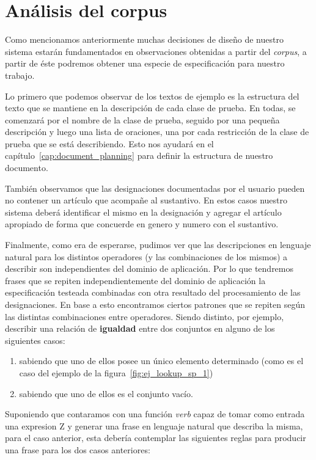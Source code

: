 \section{Análisis del corpus}
\label{sec:corpus_analisis}

Como mencionamos anteriormente muchas decisiones de diseño de nuestro sistema estarán fundamentados en observaciones obtenidas a partir del \emph{corpus}, a partir de éste podremos obtener una especie de especificación para nuestro trabajo.

Lo primero que podemos observar de los textos de ejemplo es la estructura del texto que se mantiene en la descripción de cada clase de prueba. En todas, se comenzará por el nombre de la clase de prueba, seguido por una pequeña descripción y luego una lista de oraciones, una por cada restricción de la clase de prueba que se está describiendo. Esto nos ayudará en el capítulo~\ref{cap:document_planning} para definir la estructura de nuestro documento. 



También observamos que las designaciones documentadas por el usuario pueden no contener un artículo que acompañe al sustantivo. En estos casos nuestro sistema deberá identificar el mismo en la designación y agregar el artículo apropiado de forma que concuerde en genero y numero con el sustantivo. 

Finalmente, como era de esperarse, pudimos ver que las descripciones en lenguaje natural para los distintos operadores (y las combinaciones de los mismos) a describir son independientes del dominio de aplicación. Por lo que tendremos frases que se repiten independientemente del dominio de aplicación la especificación testeada combinadas con otra resultado del procesamiento de las designaciones. En base a esto encontramos ciertos patrones que se repiten según las distintas combinaciones entre operadores.  Siendo distinto, por ejemplo, describir una relación de \textbf{igualdad} entre dos conjuntos en alguno de los siguientes casos: 

\begin{enumerate}
	\item sabiendo que uno de ellos posee un único elemento determinado (como es el caso del ejemplo de la figura~\ref{fig:ej_lookup_sp_1})
	\item sabiendo que uno de ellos es el conjunto vacío.
\end{enumerate}

\medskip
Suponiendo que contaramos con una función \emph{verb} capaz de tomar como entrada una expresion Z y generar una frase en lenguaje natural que describa la misma, para el caso anterior, esta debería contemplar las siguientes reglas para producir una frase para los dos casos anteriores:

